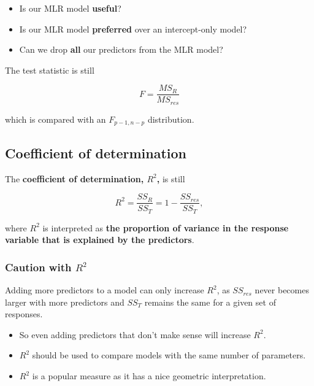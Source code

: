 \documentclass[
]{book}
\providecommand{\tightlist}{%
  \setlength{\itemsep}{0pt}\setlength{\parskip}{0pt}}
\begin{document}
\begin{itemize}
\tightlist
\item
  Is our MLR model \textbf{useful}?
\item
  Is our MLR model \textbf{preferred} over an intercept-only model?
\item
  Can we drop \textbf{all} our predictors from the MLR model?
\end{itemize}

The test statistic is still

\begin{equation}
F = \frac{MS_R}{MS_{res}}
\label{eq:6ANOVA}
\end{equation}

which is compared with an \(F_{p-1,n-p}\) distribution.

\hypertarget{coefficient-of-determination-1}{%
\subsection{Coefficient of determination}\label{coefficient-of-determination-1}}

The \textbf{coefficient of determination, \(R^2\),} is still

\begin{equation} 
R^{2} = \frac{SS_R}{SS_T} = 1 - \frac{SS_{res}}{SS_T},
\label{eq:6R2}
\end{equation}

where \(R^{2}\) is interpreted as \textbf{the proportion of variance in the response variable that is explained by the predictors}.

\hypertarget{caution-with-r2}{%
\subsubsection{\texorpdfstring{Caution with \(R^2\)}{Caution with R\^{}2}}\label{caution-with-r2}}

Adding more predictors to a model can only increase \(R^2\), as \(SS_{res}\) never becomes larger with more predictors and \(SS_T\) remains the same for a given set of responses.

\begin{itemize}
\tightlist
\item
  So even adding predictors that don't make sense will increase \(R^2\).
\item
  \(R^2\) should be used to compare models with the same number of parameters.
\item
  \(R^2\) is a popular measure as it has a nice geometric interpretation.
\end{itemize}
\end{document}
